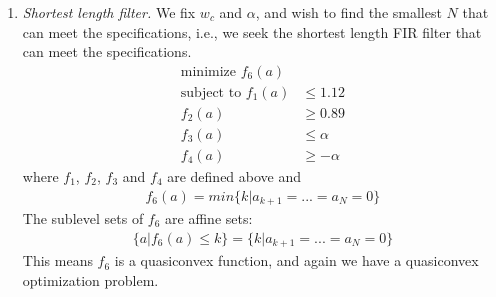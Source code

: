 \documentclass[conference]{IEEEtran}
\begin{document}
\begin{enumerate}[label=(\alph*)]
\item \textit{Shortest length filter.} We fix $w_c$ and $\alpha$, and wish to find the smallest $N$ that can meet the specifications, i.e., we seek the shortest length FIR filter that can meet the specifications.
\begin{align}
\text{minimize } f_6(a)\\
\text{subject to } f_1(a)&\le 1.12\\
				   f_2(a)&\ge 0.89\\
				   f_3(a)&\le \alpha\\
				   f_4(a)&\ge -\alpha
\end{align}
where $f_1$, $f_2$, $f_3$ and $f_4$ are defined above and
\begin{align}
f_6(a) = min\{k|a_{k+1} = ...=a_N=0\}
\end{align}
The sublevel sets of $f_6$ are affine sets:
\begin{align}
\{a|f_6(a)\le k\} = \{k|a_{k+1} = ...=a_N=0\}
\end{align}
This means $f_6$ is a quasiconvex function, and again we have a quasiconvex optimization problem.
\end{enumerate}
\newpage
\end{document}
